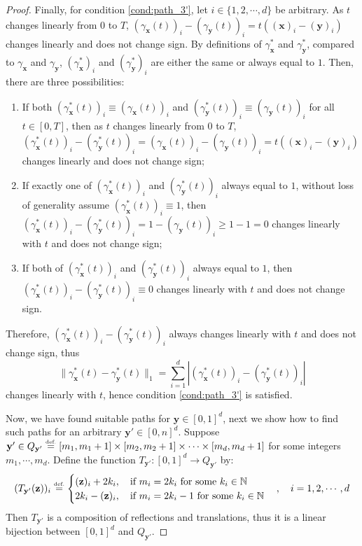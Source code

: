 \documentclass{article}
\numberwithin{equation}{section}
\theoremstyle{definition}
\newcommand{\eqdef}{\ensuremath{\stackrel{\mbox{\upshape\tiny def.}}{=}}}
\begin{document}
\begin{proof}
Finally, for condition \ref{cond:path_3'}, let $i\in\{1,2,\cdots,d\}$ be arbitrary. As $t$ changes linearly from $0$ to $T$, $(\gamma_{\mathbf{x}}(t))_i - (\gamma_{\mathbf{y}}(t))_i = t((\mathbf{x})_i - (\mathbf{y})_i)$ changes linearly and does not change sign. By definitions of $\gamma_{\mathbf{x}}^{\ast}$ and $\gamma_{\mathbf{y}}^{\ast}$, compared to $\gamma_{\mathbf{x}}$ and $\gamma_{\mathbf{y}}$, $(\gamma_{\mathbf{x}}^{\ast})_i$ and $(\gamma_{\mathbf{y}}^{\ast})_i$ are either the same or always equal to $1$. Then, there are three possibilities:
\begin{enumerate}
    \item If both $(\gamma_{\mathbf{x}}^{\ast}(t))_i \equiv (\gamma_{\mathbf{x}}(t))_i$ and $(\gamma_{\mathbf{y}}^{\ast}(t))_i \equiv (\gamma_{\mathbf{y}}(t))_i$ for all $t\in [0,T]$, then as $t$ changes linearly from $0$ to $T$, $(\gamma_{\mathbf{x}}^{\ast}(t))_i - (\gamma_{\mathbf{y}}^{\ast}(t))_i = (\gamma_{\mathbf{x}}(t))_i - (\gamma_{\mathbf{y}}(t))_i = t((\mathbf{x})_i - (\mathbf{y})_i)$ changes linearly and does not change sign;
    \item If exactly one of $(\gamma_{\mathbf{x}}^{\ast}(t))_i$ and $(\gamma_{\mathbf{y}}^{\ast}(t))_i$ always equal to $1$, without loss of generality assume $(\gamma_{\mathbf{x}}^{\ast}(t))_i \equiv 1$, then $(\gamma_{\mathbf{x}}^{\ast}(t))_i - (\gamma_{\mathbf{y}}^{\ast}(t))_i = 1 - (\gamma_{\mathbf{y}}(t))_i \ge 1 - 1 = 0$ changes linearly with $t$ and does not change sign;
    \item If both of $(\gamma_{\mathbf{x}}^{\ast}(t))_i$ and $(\gamma_{\mathbf{y}}^{\ast}(t))_i$ always equal to $1$, then $(\gamma_{\mathbf{x}}^{\ast}(t))_i - (\gamma_{\mathbf{y}}^{\ast}(t))_i \equiv 0$ changes linearly with $t$ and does not change sign.
\end{enumerate}
Therefore, $(\gamma_{\mathbf{x}}^{\ast}(t))_i - (\gamma_{\mathbf{y}}^{\ast}(t))_i$ always changes linearly with $t$ and does not change sign, thus
$$\| \gamma_{\mathbf{x}}^{\ast}(t) - \gamma_{\mathbf{y}}^{\ast}(t) \|_1 = 
\sum_{i=1}^d |(\gamma_{\mathbf{x}}^{\ast}(t))_i - (\gamma_{\mathbf{y}}^{\ast}(t))_i|$$
changes linearly with $t$, hence condition \ref{cond:path_3'} is satisfied.

Now, we have found suitable paths for $\mathbf{y}\in[0,1]^d$, next we show how to find such paths for an arbitrary $\mathbf{y}'\in[0,n]^d$. 
Suppose $\mathbf{y}'\in Q_{\mathbf{y}'}  \eqdef  [m_1,m_1+1] \times [m_2,m_2+1] \times \cdots \times [m_d,m_d+1]$ for some integers $m_1,\cdots,m_d$. Define the function $T_{\mathbf{y}'} : [0,1]^d \rightarrow Q_{\mathbf{y}'}$ by: 
$$(T_{\mathbf{y}'}(\mathbf{z}))_i  \eqdef  
\begin{cases}
    (\mathbf{z})_i + 2k_i,  \quad 
    \text{if } m_i = 2k_i \text{ for some } k_i \in \mathbb{N}  \\
    2k_i - (\mathbf{z})_i,  \quad 
    \text{if } m_i = 2k_i - 1 \text{ for some } k_i \in \mathbb{N}  \\
\end{cases},
\quad i=1,2,\cdots,d$$
Then $T_{\mathbf{y}'}$ is a composition of reflections and translations, thus it is a linear bijection between $[0,1]^d$ and $Q_{\mathbf{y}'}$. 


\end{proof}
\end{document}

